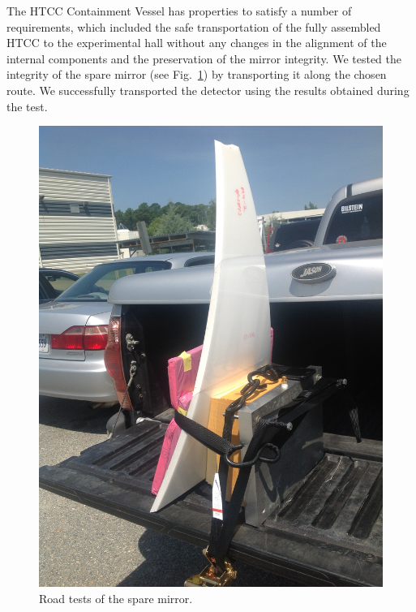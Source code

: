 The HTCC Containment Vessel has properties to satisfy a number of requirements, which included the safe
transportation of the fully assembled HTCC to the experimental hall without any changes in the alignment of the
internal components and the preservation of the mirror integrity. We tested the integrity of the spare mirror (see Fig.~\ref{fig:transportation_spare_mirror})
by transporting it along the chosen route. We successfully
transported the detector using the results obtained during the test. 

\begin{figure}[ht]
    \centering
    \includegraphics[trim={1.5cm 5cm 0 2cm }, clip, width=\linewidth]{images/Road_Test.JPG}
    \caption{Road tests of the spare mirror.}
    \label{fig:transportation_spare_mirror}
\end{figure}

  
